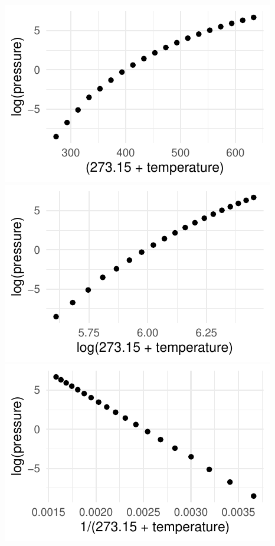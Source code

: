 \documentclass[twoside]{book}\usepackage[]{graphicx}\usepackage[]{xcolor}
\makeatletter
\def\maxwidth{ %
  \ifdim\Gin@nat@width>\linewidth
    \linewidth
  \else
    \Gin@nat@width
  \fi
}
\newenvironment{knitrout}{}{} %
\makeatother
\begin{document}
\begin{solution}
\begin{knitrout}
{\centering \includegraphics[width=\maxwidth]{figures/fig-unnamed-chunk-261-1} 
\includegraphics[width=\maxwidth]{figures/fig-unnamed-chunk-261-2} 
\includegraphics[width=\maxwidth]{figures/fig-unnamed-chunk-261-3} 

}




\end{knitrout}
\end{solution}
\end{document}
